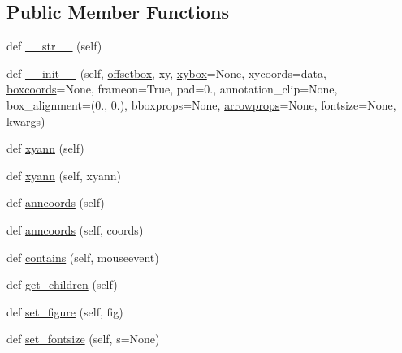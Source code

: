 \subsection*{Public Member Functions}
\begin{DoxyCompactItemize}
\item 
def \hyperlink{classmatplotlib_1_1offsetbox_1_1AnnotationBbox_a26a3f3851a8c5a6c2bd1a5726c9e840c}{\+\_\+\+\_\+str\+\_\+\+\_\+} (self)
\item 
def \hyperlink{classmatplotlib_1_1offsetbox_1_1AnnotationBbox_a92b4f807ca396315076147136686b317}{\+\_\+\+\_\+init\+\_\+\+\_\+} (self, \hyperlink{classmatplotlib_1_1offsetbox_1_1AnnotationBbox_aa90f0041e6ed2e9550c869e2e45e8966}{offsetbox}, xy, \hyperlink{classmatplotlib_1_1offsetbox_1_1AnnotationBbox_aaf4535b6fde43d621a9673b3b5398631}{xybox}=None, xycoords=\textquotesingle{}data\textquotesingle{}, \hyperlink{classmatplotlib_1_1offsetbox_1_1AnnotationBbox_a616654bc81c603102e6edfaff260a810}{boxcoords}=None, frameon=True, pad=0., annotation\+\_\+clip=None, box\+\_\+alignment=(0., 0.), bboxprops=None, \hyperlink{classmatplotlib_1_1offsetbox_1_1AnnotationBbox_a46ad3711eb74393eecb9ec71873632d8}{arrowprops}=None, fontsize=None, kwargs)
\item 
def \hyperlink{classmatplotlib_1_1offsetbox_1_1AnnotationBbox_a095eacbd1302d12be24b1fc774aacbf7}{xyann} (self)
\item 
def \hyperlink{classmatplotlib_1_1offsetbox_1_1AnnotationBbox_ad8ee384dbca4abd4bed1bf86555bd1cc}{xyann} (self, xyann)
\item 
def \hyperlink{classmatplotlib_1_1offsetbox_1_1AnnotationBbox_a202eb4c1ac3201c055ff7278b9e180fb}{anncoords} (self)
\item 
def \hyperlink{classmatplotlib_1_1offsetbox_1_1AnnotationBbox_adc0a94141c92c08021c348f46874a9d1}{anncoords} (self, coords)
\item 
def \hyperlink{classmatplotlib_1_1offsetbox_1_1AnnotationBbox_a309f3f48c4cc63ea2d41e5f9e3bb9b93}{contains} (self, mouseevent)
\item 
def \hyperlink{classmatplotlib_1_1offsetbox_1_1AnnotationBbox_ad663c55911c83200089b571ef9c862b6}{get\+\_\+children} (self)
\item 
def \hyperlink{classmatplotlib_1_1offsetbox_1_1AnnotationBbox_a31139eeefa1d46db0ed8e7180bfe2b01}{set\+\_\+figure} (self, fig)
\item 
def \hyperlink{classmatplotlib_1_1offsetbox_1_1AnnotationBbox_a70c19d284664e0c571e7eca892336beb}{set\+\_\+fontsize} (self, s=None)
\item 

\end{DoxyCompactItemize}
